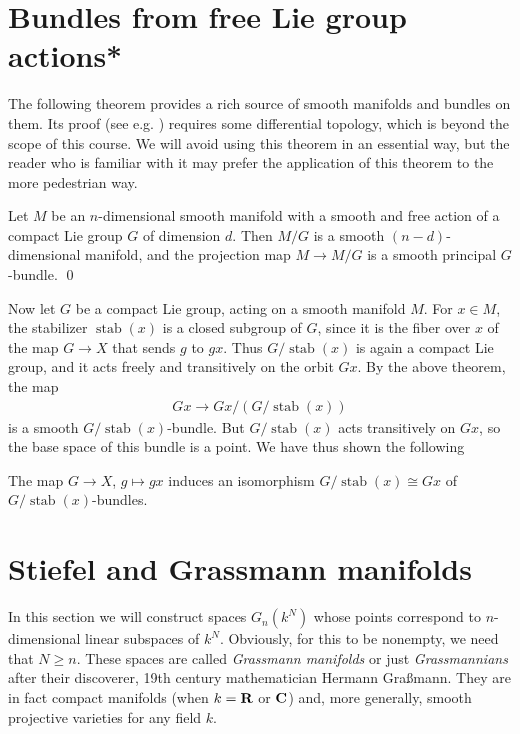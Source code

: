 \documentclass[a4paper,openany]{scrbook}
\DeclareMathOperator{\stab}{stab}
\begin{document}
\section{Bundles from free Lie group actions*}

The following theorem provides a rich source of smooth manifolds and bundles on them. Its proof (see e.g. \cite[Chapter 7]{lee:smooth-manifolds}) requires some differential topology, which is beyond the scope of this course. We will avoid using this theorem in an essential way, but the reader who is familiar with it may prefer the application of this theorem to the more pedestrian way.

\begin{thm} \label{thm:freeLiegroupaction}
Let $M$ be an $n$-dimensional smooth manifold with a smooth and free action of a compact Lie group $G$ of dimension $d$. Then $M/G$ is a smooth $(n-d)$-dimensional manifold, and the projection map $M \to M/G$ is a smooth principal $G$-bundle. \qed
\end{thm}

Now let $G$ be a compact Lie group, acting on a smooth manifold $M$. For $x \in M$, the stabilizer $\stab(x)$ is a closed subgroup of $G$, since it is the fiber over $x$ of the map $G \to X$ that sends $g$ to $gx$. Thus $G/ \stab(x)$ is again a compact Lie group, and it acts freely and transitively on the orbit $Gx$. By the above theorem, the map
\begin{align*}
Gx \to Gx / (G/\stab(x))
\end{align*}
is a smooth $G/\stab(x)$-bundle. But $G/\stab(x)$ acts transitively on $Gx$, so the base space of this bundle is a point. We have thus shown the following
\begin{corollary}
	The map $G \to X$, $g \mapsto gx$ induces an isomorphism $G/\stab(x) \cong Gx$ of $G/\stab(x)$-bundles.
\end{corollary}	


\section{Stiefel and Grassmann manifolds}\label{sec:stiefelgrassmann}

In this section we will construct spaces $G_n(k^N)$ whose points correspond to $n$-dimensional linear subspaces of $k^N$. Obviously, for this to be nonempty, we need that $N \geq n$. These spaces are called \emph{Grassmann manifolds} or just \emph{Grassmannians} after their discoverer, 19th century mathematician Hermann Graßmann. They are in fact compact manifolds (when $k=\mathbf R$ or $\mathbf C$) and, more generally, smooth projective varieties for any field $k$.
\end{document}

